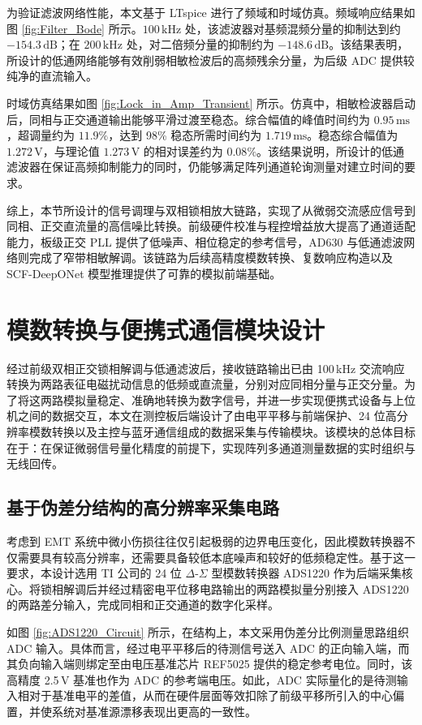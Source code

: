 为验证滤波网络性能，本文基于 LTspice 进行了频域和时域仿真。频域响应结果如图 \ref{fig:Filter_Bode} 所示。$100\,\mathrm{kHz}$ 处，该滤波器对基频混频分量的抑制达到约 $-154.3\,\mathrm{dB}$；在 $200\,\mathrm{kHz}$ 处，对二倍频分量的抑制约为 $-148.6\,\mathrm{dB}$。该结果表明，所设计的低通网络能够有效削弱相敏检波后的高频残余分量，为后级 ADC 提供较纯净的直流输入。

时域仿真结果如图 \ref{fig:Lock_in_Amp_Transient} 所示。仿真中，相敏检波器启动后，同相与正交通道输出能够平滑过渡至稳态。综合幅值的峰值时间约为 $0.95\,\mathrm{ms}$，超调量约为 $11.9\%$，达到 98\% 稳态所需时间约为 $1.719\,\mathrm{ms}$。稳态综合幅值为 $1.272\,\mathrm{V}$，与理论值 $1.273\,\mathrm{V}$ 的相对误差约为 $0.08\%$。该结果说明，所设计的低通滤波器在保证高频抑制能力的同时，仍能够满足阵列通道轮询测量对建立时间的要求。

综上，本节所设计的信号调理与双相锁相放大链路，实现了从微弱交流感应信号到同相、正交直流量的高信噪比转换。前级硬件校准与程控增益放大提高了通道适配能力，板级正交 PLL 提供了低噪声、相位稳定的参考信号，AD630 与低通滤波网络则完成了窄带相敏解调。该链路为后续高精度模数转换、复数响应构造以及 SCF-DeepONet 模型推理提供了可靠的模拟前端基础。

\section{模数转换与便携式通信模块设计}

经过前级双相正交锁相解调与低通滤波后，接收链路输出已由 100\,kHz 交流响应转换为两路表征电磁扰动信息的低频或直流量，分别对应同相分量与正交分量。为了将这两路模拟量稳定、准确地转换为数字信号，并进一步实现便携式设备与上位机之间的数据交互，本文在测控板后端设计了由电平平移与前端保护、24 位高分辨率模数转换以及主控与蓝牙通信组成的数据采集与传输模块。该模块的总体目标在于：在保证微弱信号量化精度的前提下，实现阵列多通道测量数据的实时组织与无线回传。

\subsection{基于伪差分结构的高分辨率采集电路}

考虑到 EMT 系统中微小伤损往往仅引起极弱的边界电压变化，因此模数转换器不仅需要具有较高分辨率，还需要具备较低本底噪声和较好的低频稳定性。基于这一要求，本设计选用 TI 公司的 24 位 $\Delta$-$\Sigma$ 型模数转换器 ADS1220 作为后端采集核心。将锁相解调后并经过精密电平位移电路输出的两路模拟量分别接入 ADS1220 的两路差分输入，完成同相和正交通道的数字化采样。

如图 \ref{fig:ADS1220_Circuit} 所示，在结构上，本文采用伪差分比例测量思路组织 ADC 输入。具体而言，经过电平平移后的待测信号送入 ADC 的正向输入端，而其负向输入端则绑定至由电压基准芯片 REF5025 提供的稳定参考电位。同时，该高精度 2.5\,V 基准也作为 ADC 的参考端电压。如此，ADC 实际量化的是待测输入相对于基准电平的差值，从而在硬件层面等效扣除了前级平移所引入的中心偏置，并使系统对基准源漂移表现出更高的一致性。

